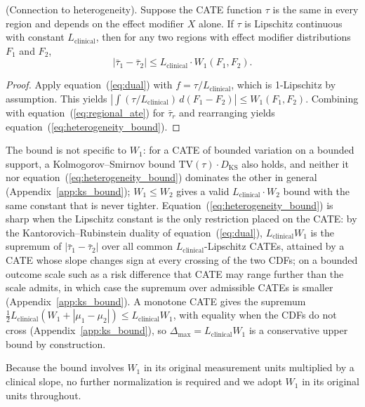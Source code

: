 \documentclass[AMA,Times1COL]{WileyNJDv5}
\begin{document}
\begin{proposition}\label{prop:heterogeneity}
\textup{(Connection to heterogeneity).} Suppose the CATE function $\tau$ is the same in every region and depends on the effect modifier $X$ alone. If $\tau$ is Lipschitz continuous with constant $L_{\text{clinical}}$, then for any two regions with effect modifier distributions $F_1$ and $F_2$,
\begin{equation}
|\bar{\tau}_1 - \bar{\tau}_2| \leq L_{\text{clinical}} \cdot W_1(F_1, F_2).
\label{eq:heterogeneity_bound}
\end{equation}
\end{proposition}

\begin{proof}
Apply equation~(\ref{eq:dual}) with $f = \tau / L_{\text{clinical}}$, which is 1-Lipschitz by assumption. This yields $\left|\int (\tau / L_{\text{clinical}}) \, d(F_1 - F_2)\right| \leq W_1(F_1, F_2)$. Combining with equation~(\ref{eq:regional_ate}) for $\bar{\tau}_r$ and rearranging yields equation~(\ref{eq:heterogeneity_bound}).
\end{proof}

\noindent %
The bound is not specific to $W_1$: for a CATE of bounded variation on a bounded support, a Kolmogorov--Smirnov bound $\mathrm{TV}(\tau) \cdot D_{\text{KS}}$ also holds, and neither it nor equation~(\ref{eq:heterogeneity_bound}) dominates the other in general (Appendix~\ref{app:ks_bound}); $W_1 \leq W_2$ gives a valid $L_{\text{clinical}} \cdot W_2$ bound with the same constant that is never tighter. Equation~(\ref{eq:heterogeneity_bound}) is sharp when the Lipschitz constant is the only restriction placed on the CATE: by the Kantorovich--Rubinstein duality of equation~(\ref{eq:dual}), $L_{\text{clinical}} W_1$ is the supremum of $|\bar{\tau}_1 - \bar{\tau}_2|$ over all common $L_{\text{clinical}}$-Lipschitz CATEs, attained by a CATE whose slope changes sign at every crossing of the two CDFs; on a bounded outcome scale such as a risk difference that CATE may range further than the scale admits, in which case the supremum over admissible CATEs is smaller (Appendix~\ref{app:ks_bound}). A monotone CATE gives the supremum $\tfrac{1}{2} L_{\text{clinical}} (W_1 + |\mu_1 - \mu_2|) \leq L_{\text{clinical}} W_1$, with equality when the CDFs do not cross (Appendix~\ref{app:ks_bound}), so $\Delta_{\max} = L_{\text{clinical}} W_1$ is a conservative upper bound by construction.%

Because the bound involves $W_1$ in its original measurement units multiplied by a clinical slope, no further normalization is required and we adopt $W_1$ in its original units throughout.
\end{document}

